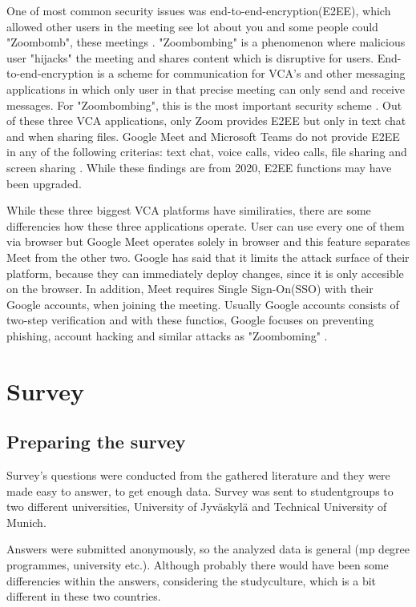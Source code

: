 \documentclass[utf8,english]{gradu3}
\begin{document}
One of most common security issues was end-to-end-encryption(E2EE), which allowed other users in the meeting see lot about you and some people could "Zoombomb", these meetings \parencite{goneWrongZoom}. "Zoombombing" is a phenomenon where malicious user "hijacks" the meeting and shares content which is disruptive for users. End-to-end-encryption is a scheme for communication for VCA's and other messaging applications in which only user in that precise meeting can only send and receive messages. For "Zoombombing", this is the most important security scheme \parencite{e2eeZoom}.
Out of these three VCA applications, only Zoom provides E2EE but only in text chat and when sharing files. Google Meet and Microsoft Teams do not provide E2EE in any of the following criterias: text chat, voice calls, video calls, file sharing and screen sharing \parencite{safetyOfVca}. While these findings are from 2020, E2EE functions may have been upgraded.

While these three biggest VCA platforms have similiraties, there are some differencies how these three applications operate. User can use every one of them via browser but Google Meet operates solely in browser and this feature separates Meet from the other two. Google has said that it limits the attack surface of their platform, because they can immediately deploy changes, since it is only accesible on the browser. In addition, Meet requires Single Sign-On(SSO) with their Google accounts, when joining the meeting. Usually Google accounts consists of two-step verification and with these functios, Google focuses on preventing phishing, account hacking and similar attacks as "Zoomboming" \parencite{dynamicSecurityAnalysis}.

\chapter{Survey}
\label{vca}
\section{Preparing the survey}
Survey's questions were conducted from the gathered literature and they were made easy to answer, to get enough data. Survey was sent to studentgroups to two different universities, University of Jyväskylä and Technical University of Munich. 

Answers were submitted anonymously, so the analyzed data is general (mp degree programmes, university etc.). Although probably there would have been some differencies within the answers, considering the studyculture, which is a bit different in these two countries.
\end{document}
